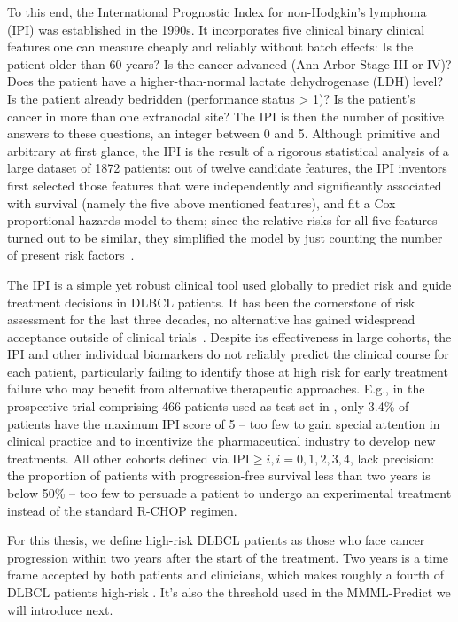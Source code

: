 To this end, the International Prognostic Index for non-Hodgkin's lymphoma (IPI) was established in the 
1990s. It incorporates five clinical binary clinical features one can measure cheaply and reliably without batch 
effects: Is the patient older than 60 years? Is the cancer advanced (Ann Arbor Stage III or IV)? Does 
the patient have a higher-than-normal lactate dehydrogenase (LDH) level? Is the patient already 
bedridden (performance status > 1)? Is the patient's cancer in more than one extranodal site? The 
IPI is then the number of positive answers to these questions, an integer between 0 and 5. Although 
primitive and arbitrary at first glance, the IPI is the result of a rigorous statistical analysis 
of a large dataset of \num{1872} patients: out of twelve candidate features, the IPI inventors
first selected those features that were independently and significantly associated with survival 
(namely the five above mentioned features), and fit a Cox proportional hazards model to them;
since the relative risks for all five features turned out to be similar, they simplified the model 
by just counting the number of present risk factors~\cite{ipi93}. 

The IPI is a simple yet robust clinical tool used globally to predict risk and guide 
treatment decisions in DLBCL patients. It has been the cornerstone of risk assessment for the last 
three decades, no alternative has gained widespread acceptance outside of clinical 
trials~\citep{ipi-stay-strong}. 
Despite its effectiveness in large cohorts, the IPI and other individual 
biomarkers do not reliably predict the clinical course for each patient, particularly failing to 
identify those at high risk for early treatment failure who may benefit from alternative therapeutic 
approaches. E.g., in the prospective trial comprising \num{466} patients used as test set in 
\citep{staiger20}, only \num{3.4}\% of patients have the maximum IPI score of 5 -- too few
to gain special attention in clinical practice and to incentivize the pharmaceutical industry to 
develop new treatments. All other cohorts defined via $\text{IPI} \geq i, i = 0, 1, 2, 3, 4$, lack 
precision: the proportion of patients with progression-free survival less than two years is below 
\num{50}\% -- too few to persuade a patient to undergo an experimental treatment instead of the 
standard R-CHOP regimen.

For this thesis, we define high-risk DLBCL patients as those who face cancer progression 
within two years after the start of the treatment. Two years is a time frame accepted by both 
patients and clinicians, which makes roughly a fourth of DLBCL patients high-risk \cite{staiger20}.
It's also the threshold used in the MMML-Predict we will introduce next.

